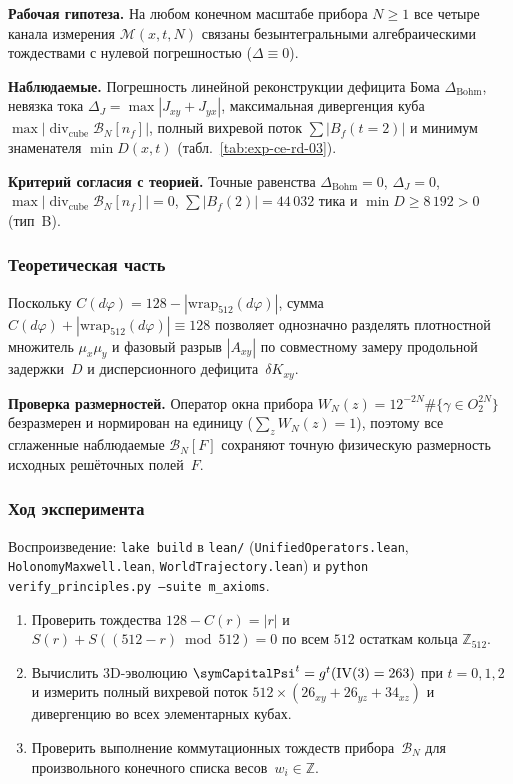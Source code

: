 \textbf{Рабочая гипотеза.}
На любом конечном масштабе прибора $N\ge 1$ все четыре канала измерения $\mathcal{M}(x,t,N)$ связаны безынтегральными алгебраическими тождествами с нулевой погрешностью ($\Delta \equiv 0$).

\textbf{Наблюдаемые.}
Погрешность линейной реконструкции дефицита Бома $\Delta_{\mathrm{Bohm}}$, невязка тока $\Delta_J = \max|J_{xy}+J_{yx}|$, максимальная дивергенция куба $\max|\operatorname{div}_{\mathrm{cube}}\mathcal{B}_N[n_f]|$, полный вихревой поток $\sum |B_f(t=2)|$ и минимум знаменателя $\min D(x,t)$ (табл.~\ref{tab:exp-ce-rd-03}).

\textbf{Критерий согласия с теорией.}
Точные равенства $\Delta_{\mathrm{Bohm}} = 0$, $\Delta_J = 0$, $\max|\operatorname{div}_{\mathrm{cube}}\mathcal{B}_N[n_f]| = 0$, $\sum |B_f(2)| = 44\,032$ тика и $\min D \ge 8\,192 > 0$ (тип~B).

\subsubsection*{Теоретическая часть}
Поскольку $C(d\varphi) = 128 - |\mathrm{wrap}_{512}(d\varphi)|$, сумма $C(d\varphi) + |\mathrm{wrap}_{512}(d\varphi)| \equiv 128$ позволяет однозначно разделять плотностной множитель $\mu_x\mu_y$ и фазовый разрыв $|A_{xy}|$ по совместному замеру продольной задержки~$D$ и дисперсионного дефицита~$\delta K_{xy}$.

\textbf{Проверка размерностей.}
Оператор окна прибора $W_N(z) = 12^{-2N}\#\{\gamma\in O_2^{2N}\}$ безразмерен и нормирован на единицу ($\sum_z W_N(z) = 1$), поэтому все сглаженные наблюдаемые $\mathcal{B}_N[F]$ сохраняют точную физическую размерность исходных решёточных полей~$F$.

\subsubsection*{Ход эксперимента}
{\sloppy Воспроизведение: \texttt{lake build} в \texttt{lean/} (\texttt{UnifiedOperators.lean}, \texttt{HolonomyMaxwell.lean}, \texttt{WorldTrajectory.lean}) и \texttt{python verify\_principles.py --suite m\_axioms}.\par}

\begin{enumerate}[label=\textbf{Шаг \arabic*:},leftmargin=*,itemsep=0.35em]
\item Проверить тождества $128 - C(r) = |r|$ и $S(r) + S((512-r)\bmod 512) = 0$ по всем $512$ остаткам кольца $\mathbb{Z}_{512}$.
\item Вычислить 3D-эволюцию $\symCapitalPsi^t = g^t(\mathrm{IV}(3)=263)$ при $t=0,1,2$ и измерить полный вихревой поток $512\times(26_{xy}+26_{yz}+34_{xz})$ и дивергенцию во всех элементарных кубах.
\item Проверить выполнение коммутационных тождеств прибора~$\mathcal{B}_N$ для произвольного конечного списка весов~$w_i\in\mathbb{Z}$.
\end{enumerate}

